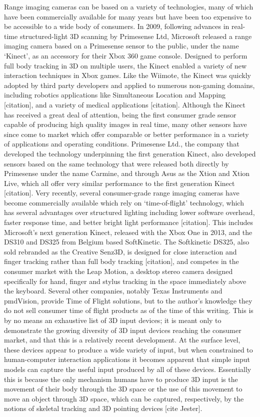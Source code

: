Range imaging cameras can be based on a variety of technologies, many of which have been commercially available for many years but have been too expensive to be accessible to a wide body of consumers. In 2009, following advances in real-time structured-light 3D scanning by Primesense Ltd, Microsoft released a range imaging camera based on a Primesense sensor to the public, under the name ‘Kinect’, as an accessory for their Xbox 360 game console. Designed to perform full body tracking in 3D on multiple users, the Kinect enabled a variety of new interaction techniques in Xbox games. Like the Wiimote, the Kinect was quickly adopted by third party developers and applied to numerous non-gaming domains, including robotics applications like Simultaneous Location and Mapping [citation], and a variety of medical applications [citation]. Although the Kinect has received a great deal of attention, being the first consumer grade sensor capable of producing high quality images in real time, many other sensors have since come to market which offer comparable or better performance in a variety of applications and operating conditions. Primesense Ltd., the company that developed the technology underpinning the first generation Kinect, also developed sensors based on the same technology that were released both directly by Primesense under the name Carmine, and through Asus as the Xtion  and Xtion Live, which all offer very similar performance to the first generation Kinect [citation]. Very recently, several consumer-grade range imaging cameras have become commercially available which rely on ‘time-of-flight’ technology, which has several advantages over structured lighting including lower software overhead, faster response time, and better bright light performance [citation]. This includes Microsoft’s next generation Kinect, released with the Xbox One in 2013, and the DS310 and DS325 from Belgium based SoftKinetic. The Softkinetic DS325, also sold rebranded as the Creative Senz3D, is designed for close interaction and finger tracking rather than full body tracking [citation], and competes in the consumer market with the Leap Motion, a desktop stereo camera designed specifically for hand, finger and stylus tracking in the space immediately above the keyboard. Several other companies, notably Texas Instruments and pmdVision, provide Time of Flight solutions, but to the author’s knowledge they do not sell consumer time of flight products as of the time of this writing. 
This is by no means an exhaustive list of 3D input devices; it is meant only to demonstrate the growing diversity of 3D input devices reaching the consumer market, and that this is a relatively recent development. At the surface level, these devices appear to produce a wide variety of input, but when constrained to human-computer interaction applications it becomes apparent that simple input models can capture the useful input produced by all of these devices. Essentially this is because the only mechanism humans have to produce 3D input is the movement of their body through the 3D space or the use of this movement to move an object through 3D space, which can be captured, respectively, by the notions of skeletal tracking and 3D pointing devices [cite Jester].

